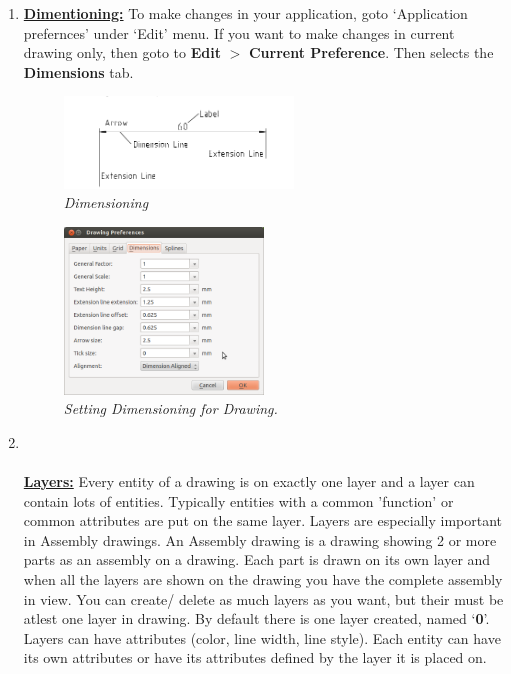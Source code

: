 \begin{enumerate}
\vspace{0.2in}
\item{\textbf{\underline{Dimentioning:}} To make changes in your application, goto `Application prefernces' under `Edit' menu. If you want to make changes in current drawing only, then goto to \textbf{Edit} $>$ \textbf{Current Preference}. Then selects the \textbf{Dimensions} tab.   
       \begin{figure}[h!]
       \centering\includegraphics[width=230px]{./images/dimen.png}
       \caption{\small \sl Dimensioning}
       \end{figure}
       \begin{figure}[h!]
       \centering\includegraphics[width=200px]{./images/dimensions.png}
       \caption{\small \sl Setting Dimensioning for Drawing.}
       \end{figure}
}
\item{\underline{\textbf{\\\\Layers:}} Every entity of a drawing is on exactly one layer and a layer can contain
lots of entities. Typically entities with a common 'function' or common attributes are
put on the same layer. Layers are especially important in Assembly drawings. An Assembly drawing is a
drawing showing 2 or more parts as an assembly on a drawing. Each part is drawn on
its own layer and when all the layers are shown on the drawing you have the complete
assembly in view. You can create/ delete as much layers as you want, but their must be atlest one layer in drawing. By default there is one layer created, named `\textbf{0}'. Layers can have attributes (color, line width, line
style). Each entity can have its own attributes or have its attributes defined by the
layer it is placed on.
}
\end{enumerate}
